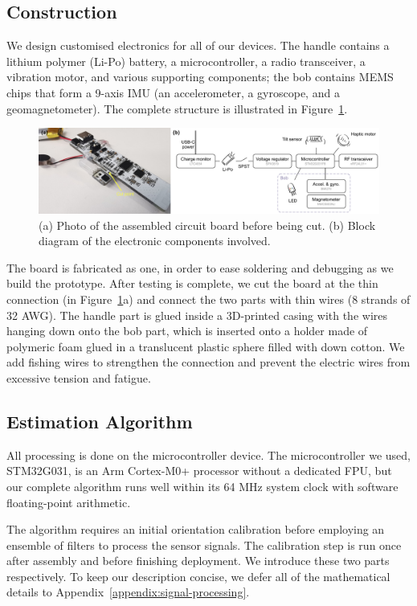 \documentclass{nime-alternate} %
\begin{document}
\subsection{Construction}
We design customised electronics for all of our devices. The handle contains a lithium polymer (Li-Po) battery, a microcontroller, a radio transceiver, a vibration motor, and various supporting components; the bob contains MEMS chips that form a 9-axis IMU (an accelerometer, a gyroscope, and a geomagnetometer). The complete structure is illustrated in Figure~\ref{fig:WandConstruction}.

\begin{figure}[t!]
  \centering
  \includegraphics[width=1\textwidth]{Mw_Wand.pdf}
  \caption{(a) Photo of the assembled circuit board before being cut. (b) Block diagram of the electronic components involved.}
  \label{fig:WandConstruction}
\end{figure}

The board is fabricated as one, in order to ease soldering and debugging as we build the prototype. After testing is complete, we cut the board at the thin connection (in Figure~\ref{fig:WandConstruction}a) and connect the two parts with thin wires (8 strands of 32 AWG). The handle part is glued inside a 3D-printed casing with the wires hanging down onto the bob part, which is inserted onto a holder made of polymeric foam glued in a translucent plastic sphere filled with down cotton. We add fishing wires to strengthen the connection and prevent the electric wires from excessive tension and fatigue.

\subsection{Estimation Algorithm}
All processing is done on the microcontroller device. The microcontroller we used, STM32G031, is an Arm Cortex-M0+ processor without a dedicated FPU, but our complete algorithm runs well within its 64 MHz system clock with software floating-point arithmetic.

The algorithm requires an initial orientation calibration before employing an ensemble of filters to process the sensor signals. The calibration step is run once after assembly and before finishing deployment. We introduce these two parts respectively. To keep our description concise, we defer all of the mathematical details to Appendix~\ref{appendix:signal-processing}.
\end{document}
